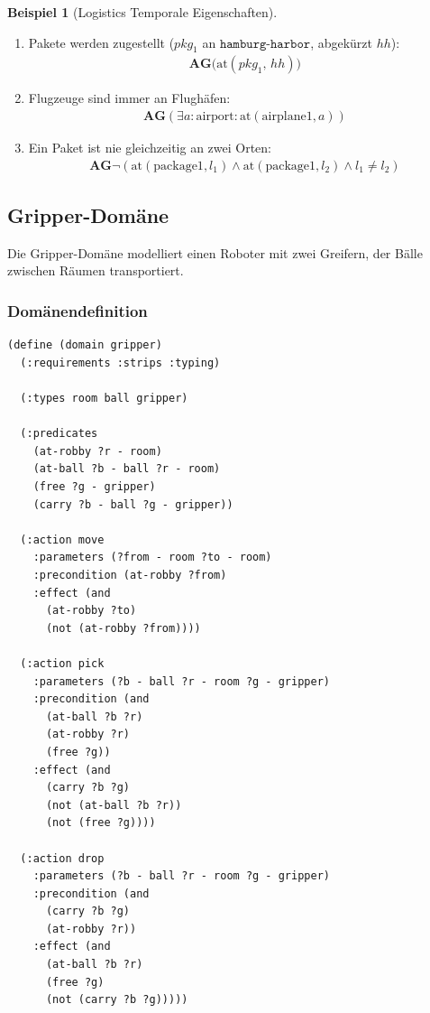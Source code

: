 ﻿\documentclass[a4paper,12pt]{article}
\theoremstyle{definition}
\newtheorem{beispiel}{Beispiel}[section]
\begin{document}
\begin{beispiel}[Logistics Temporale Eigenschaften]
	\begin{enumerate}
		\item Pakete werden zugestellt
		($\mathit{pkg}_1$ an $\texttt{hamburg-harbor}$, abgekürzt $\mathit{hh}$):
		\begin{align}
		\mathbf{AG}\bigl(\mathrm{at}(\mathit{pkg}_1,\,\mathit{hh})\bigr)
		\end{align}
		
		\item Flugzeuge sind immer an Flughäfen:
		\begin{align}
		\mathbf{AG}(\exists a: \text{airport}: \text{at}(\text{airplane1}, a))
		\end{align}
		
		\item Ein Paket ist nie gleichzeitig an zwei Orten:
		\begin{align}
		\mathbf{AG}\neg(\text{at}(\text{package1}, l_1) \land \text{at}(\text{package1}, l_2) \land l_1 \neq l_2)
		\end{align}
	\end{enumerate}
\end{beispiel}

\subsection{Gripper-Domäne}

Die Gripper-Domäne modelliert einen Roboter mit zwei Greifern, der Bälle zwischen Räumen transportiert.

\subsubsection{Domänendefinition}

\begin{lstlisting}[language=PDDL, caption=Gripper Domäne]
(define (domain gripper)
  (:requirements :strips :typing)
  
  (:types room ball gripper)
  
  (:predicates
    (at-robby ?r - room)
    (at-ball ?b - ball ?r - room)
    (free ?g - gripper)
    (carry ?b - ball ?g - gripper))
  
  (:action move
    :parameters (?from - room ?to - room)
    :precondition (at-robby ?from)
    :effect (and
      (at-robby ?to)
      (not (at-robby ?from))))
  
  (:action pick
    :parameters (?b - ball ?r - room ?g - gripper)
    :precondition (and
      (at-ball ?b ?r)
      (at-robby ?r)
      (free ?g))
    :effect (and
      (carry ?b ?g)
      (not (at-ball ?b ?r))
      (not (free ?g))))
  
  (:action drop
    :parameters (?b - ball ?r - room ?g - gripper)
    :precondition (and
      (carry ?b ?g)
      (at-robby ?r))
    :effect (and
      (at-ball ?b ?r)
      (free ?g)
      (not (carry ?b ?g)))))
\end{lstlisting}
\end{document}
